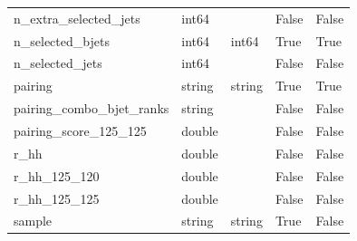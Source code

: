 \begin{tabular}{lllll}
n\_extra\_selected\_jets & int64 &  & False & False \\
n\_selected\_bjets & int64 & int64 & True & True \\
n\_selected\_jets & int64 &  & False & False \\
pairing & string & string & True & True \\
pairing\_combo\_bjet\_ranks & string &  & False & False \\
pairing\_score\_125\_125 & double &  & False & False \\
r\_hh & double &  & False & False \\
r\_hh\_125\_120 & double &  & False & False \\
r\_hh\_125\_125 & double &  & False & False \\
sample & string & string & True & False \\
\bottomrule
\end{tabular}
